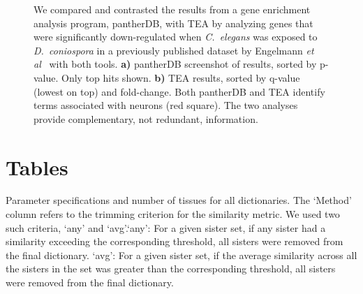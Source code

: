 \begin{figure}[htbp]
	\captionsetup{width= 0.95\textwidth}
  	\caption{
	We compared and contrasted the results from a gene enrichment analysis program, pantherDB, with TEA by analyzing genes that were significantly down-regulated when \emph{C.~elegans} was exposed to \emph{D.~coniospora} in a previously published dataset by Engelmann \emph{et al}~\cite{Engelmann2011} with both tools.
	\textbf{a)} pantherDB screenshot of results, sorted by p-value. Only top hits shown.
	\textbf{b)} TEA results, sorted by q-value (lowest on top) and fold-change.
	Both pantherDB and TEA identify terms associated with neurons (red square). The two analyses provide complementary, not redundant, information.
	}
	\label{fig:Dcon}
\end{figure}



%



\section*{Tables}

\begin{table}[p]
	\caption{
	Parameter specifications and number of tissues for all dictionaries. The `Method' column refers to the trimming criterion for the similarity metric. We used two such criteria, `any' and `avg'.`any': For a given sister set, if any sister had a similarity exceeding the corresponding threshold, all sisters were removed from the final dictionary. `avg': For a given sister set, if the average similarity across all the sisters in the set was greater than the corresponding threshold, all sisters were removed from the final dictionary.
	}

	\label{tab:DictionarySpecs}
\end{table}


